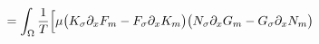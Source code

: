 \documentclass[preview]{standalone}
\newcommand{\dx}{\partial_x}
\begin{document}
\begin{align*}
\special{dvisvgm:raw <g id='unique000'>}=\int_\Omega\frac1T\Big[\mu\big(K_\sigma\dx F_m-F_\sigma\dx K_m\big)\big(N_\sigma\dx G_m-G_\sigma\dx N_m\big)\special{dvisvgm:raw </g>}
\end{align*}
\end{document}
